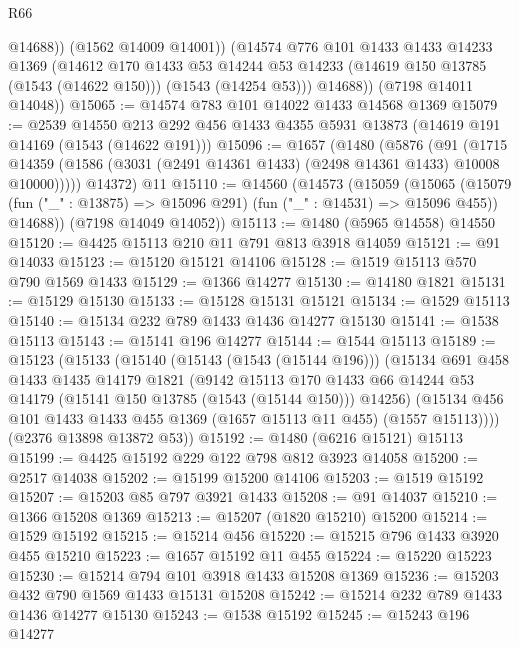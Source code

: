 \begin{lexlean}{R66}
\begin{coremodule}
              @14688))
          (@1562 @14009 @14001))
        (@14574
          @776
          @101
          @1433
          @1433
          @14233
          @1369
          (@14612
            @170
            @1433
            @53
            @14244
            @53
            @14233
            (@14619 @150 @13785 (@1543 (@14622 @150)))
            (@1543 (@14254 @53)))
          @14688))
      (@7198 @14011 @14048))
@15065 := @14574 @783 @101 @14022 @1433 @14568 @1369
@15079 := @2539
    @14550
    @213
    @292
    @456
    @1433
    @4355
    @5931
    @13873
    (@14619 @191 @14169 (@1543 (@14622 @191)))
@15096 := @1657
    (@1480
      (@5876
        (@91
          (@1715 @14359 (@1586 (@3031 (@2491 @14361 @1433) (@2498 @14361 @1433) @10008 @10000)))))
      @14372)
    @11
@15110 := @14560
    (@14573
      (@15059
        (@15065
          (@15079 (fun ("_" : @13875) => @15096 @291) (fun ("_" : @14531) => @15096 @455))
          @14688))
      (@7198 @14049 @14052))
@15113 := @1480 (@5965 @14558) @14550
@15120 := @4425 @15113 @210 @11 @791 @813 @3918 @14059
@15121 := @91 @14033
@15123 := @15120 @15121 @14106
@15128 := @1519 @15113 @570 @790 @1569 @1433
@15129 := @1366 @14277
@15130 := @14180 @1821
@15131 := @15129 @15130
@15133 := @15128 @15131 @15121
@15134 := @1529 @15113
@15140 := @15134 @232 @789 @1433 @1436 @14277 @15130
@15141 := @1538 @15113
@15143 := @15141 @196 @14277
@15144 := @1544 @15113
@15189 := @15123
    (@15133
      (@15140
        (@15143 (@1543 (@15144 @196)))
        (@15134
          @691
          @458
          @1433
          @1435
          @14179
          @1821
          (@9142
            @15113
            @170
            @1433
            @66
            @14244
            @53
            @14179
            (@15141 @150 @13785 (@1543 (@15144 @150)))
            @14256)
          (@15134 @456 @101 @1433 @1433 @455 @1369 (@1657 @15113 @11 @455) (@1557 @15113))))
      (@2376 @13898 @13872 @53))
@15192 := @1480 (@6216 @15121) @15113
@15199 := @4425 @15192 @229 @122 @798 @812 @3923 @14058
@15200 := @2517 @14038
@15202 := @15199 @15200 @14106
@15203 := @1519 @15192
@15207 := @15203 @85 @797 @3921 @1433
@15208 := @91 @14037
@15210 := @1366 @15208 @1369
@15213 := @15207 (@1820 @15210) @15200
@15214 := @1529 @15192
@15215 := @15214 @456
@15220 := @15215 @796 @1433 @3920 @455 @15210
@15223 := @1657 @15192 @11 @455
@15224 := @15220 @15223
@15230 := @15214 @794 @101 @3918 @1433 @15208 @1369
@15236 := @15203 @432 @790 @1569 @1433 @15131 @15208
@15242 := @15214 @232 @789 @1433 @1436 @14277 @15130
@15243 := @1538 @15192
@15245 := @15243 @196 @14277

\end{coremodule}
\end{lexlean}
